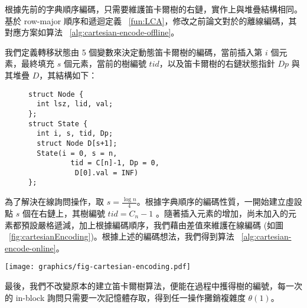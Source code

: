 

根據先前的字典順序編碼，只需要維護笛卡爾樹的右鏈，實作上與堆疊結構相同。基於 row-major 順序和遞迴定義 ~\ref{fun:LCA}，修改之前論文對於的離線編碼，其對應方案如算法 ~\ref{alg:cartesian-encode-offline}。



我們定義轉移狀態由 5 個變數來決定動態笛卡爾樹的編碼，當前插入第 $i$ 個元素，最終填充 $s$ 個元素，當前的樹編號 $\mathit{tid}$，以及笛卡爾樹的右鏈狀態指針 $Dp$ 與其堆疊 $D$，其結構如下：

\begin{figure}[!thb]
  \begin{lstlisting}[frame=single,caption=State of Cartesian Tree]
struct Node {
  int lsz, lid, val;
};
struct State {
  int i, s, tid, Dp;
  struct Node D[s+1];
  State(i = 0, s = n, 
          tid = C[n]-1, Dp = 0,
           D[0].val = INF)
};
  \end{lstlisting}
\end{figure}

為了解決在線詢問操作，取 $s = \frac{\log n}{4}$。根據字典順序的編碼性質，一開始建立虛設點 $s$ 個在右鏈上，其樹編號 $\mathit{tid} = C_n - 1$ 。隨著插入元素的增加，尚未加入的元素都預設嚴格遞減，加上根據編碼順序，我們藉由差值來維護在線編碼 (如圖 ~\ref{fig:cartesianEncoding})。根據上述的編碼想法，我們得到算法 ~\ref{alg:cartesian-encode-online}。



\begin{figure*}[!thb]
  \centering
  \texttt{[image: graphics/fig-cartesian-encoding.pdf]}
  \caption{每個區塊有 $s$ 個元素，初始情況虛設 $s$ 個點在右鏈，則具有 $s$ 個節點的 BST，其編號 $\text{tid}_0 = C_s - 1$。當插入第 $i$ 個元素時，當前編號為 $\text{tid}_i$，以節點 $A$ 為根的樹編號為 $A.\text{tid}$，若第 $i+1$ 個元素值為 $x$，其將會翻轉到 $A$ 之上，而 $A$ 成為 $x$ 的左子節點，翻轉過程中計算得到 $A.\text{tid}$，而以 $x$ 為根的樹將虛設 $s-(i+1)$ 個節點在其右鏈，最後得到 $x.\text{tid}$。根據字典順序，我們將得到 $\text{tid}_{i+1} = \text{tid}_{i} + (x.\text{tid} - A.\text{tid})$。}
  \label{fig:cartesianEncoding}
\end{figure*}

最後，我們不改變原本的建立笛卡爾樹算法，便能在過程中擭得樹的編號，每一次的 in-block 詢問只需要一次記憶體存取，得到任一操作攤銷複雜度 $\theta(1)$。